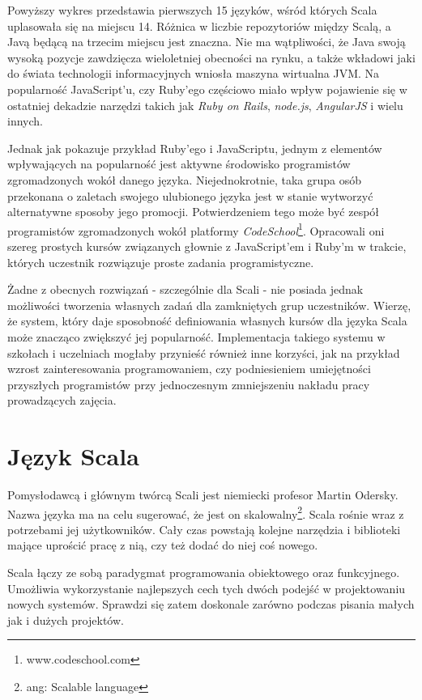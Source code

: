 \documentclass[brudnopis]{xmgr}
\begin{document}
Powyższy wykres przedstawia pierwszych 15 języków, wśród których Scala uplasowała się na miejscu 14. Różnica w liczbie repozytoriów między Scalą, a Javą będącą na trzecim miejscu jest znaczna. Nie ma wątpliwości, że Java swoją wysoką pozycje zawdzięcza wieloletniej obecności na rynku, a także wkładowi jaki do świata technologii informacyjnych wniosła maszyna wirtualna JVM. Na popularność JavaScript'u, czy Ruby'ego częściowo miało wpływ pojawienie się w ostatniej dekadzie narzędzi takich jak \textit{Ruby on Rails}, \textit{node.js}, \textit{AngularJS} i wielu innych. 

Jednak jak pokazuje przykład Ruby'ego i JavaScriptu, jednym z elementów wpływających na popularność jest aktywne środowisko programistów zgromadzonych wokół danego języka. Niejednokrotnie, taka grupa osób przekonana o zaletach swojego ulubionego języka jest w stanie wytworzyć alternatywne sposoby jego promocji. Potwierdzeniem tego może być zespół programistów zgromadzonych wokół platformy \textit{CodeSchool}\footnote{www.codeschool.com}. Opracowali oni szereg prostych kursów związanych głownie z JavaScript'em i Ruby'm w trakcie, których uczestnik rozwiązuje proste zadania programistyczne. 

Żadne z obecnych rozwiązań - szczególnie dla Scali - nie posiada jednak możliwości tworzenia własnych zadań dla zamkniętych grup uczestników. Wierzę, że system, który daje sposobność definiowania własnych kursów dla języka Scala może znacząco zwiększyć jej popularność. Implementacja takiego systemu w szkołach i uczelniach mogłaby przynieść również inne korzyści, jak na przykład wzrost zainteresowania programowaniem, czy podniesieniem umiejętności przyszłych programistów przy jednoczesnym zmniejszeniu nakładu pracy prowadzących zajęcia.

\section{Język Scala}

Pomysłodawcą i głównym twórcą Scali jest niemiecki profesor Martin Odersky. Nazwa języka ma na celu sugerować, że jest on skalowalny\footnote{ang: Scalable language}. Scala rośnie wraz z potrzebami jej użytkowników. Cały czas powstają kolejne narzędzia i biblioteki mające uprościć pracę z nią, czy też dodać do niej coś nowego. 

Scala łączy ze sobą paradygmat programowania obiektowego oraz funkcyjnego. Umożliwia wykorzystanie najlepszych cech tych dwóch podejść w projektowaniu nowych systemów. Sprawdzi się zatem doskonale zarówno podczas pisania małych jak i dużych projektów.
\end{document}
